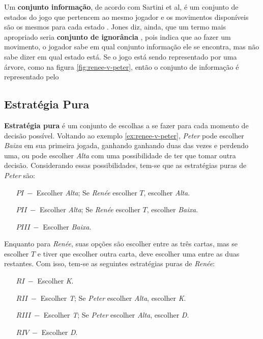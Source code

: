 Um \textbf{conjunto informação}, de acordo com Sartini et al, é um conjunto de estados do jogo que pertencem ao mesmo jogador e os movimentos disponíveis são os mesmos para cada estado \cite{sartini_IIbienaldasbm}. Jones diz, ainda, que um termo mais apropriado seria \textbf{conjunto de ignorância} \cite{jones_1980}, pois indica que ao fazer um movimento, o jogador sabe em qual conjunto informação ele se encontra, mas não sabe dizer em qual estado está. Se o jogo está sendo representado por uma árvore, como na figura \ref{fig:renee-v-peter}, então o conjunto de informação é representado pelo

\subsection{Estratégia Pura}
\label{subsec:estrategia-pura}

\textbf{Estratégia pura} é um conjunto de escolhas a se fazer para cada momento de decisão possível. Voltando ao exemplo \ref{ex:renee-v-peter}, \emph{Peter} pode escolher \emph{Baixa} em sua primeira jogada, ganhando ganhando duas das vezes e perdendo uma, ou pode escolher \emph{Alta} com uma possibilidade de ter que tomar outra decisão. Considerando essas possibilidades, tem-se que as estratégias puras de \emph{Peter} são:

\begin{enumerate}
	\tightlist
	\item[$ PI\ -$] Escolher \emph{Alta}; Se \emph{Renée} escolher $T$, escolher \emph{Alta}.
	\item[$ PII\ -$] Escolher \emph{Alta}; Se \emph{Renée} escolher $T$, escolher \emph{Baixa}.
	\item[$ PIII\ -$] Escolher \emph{Baixa}.
\end{enumerate}

Enquanto para \emph{Renée}, suas opções são escolher entre as três cartas, mas se escolher $T$ e tiver que escolher outra carta, deve escolher uma entre as duas restantes. Com isso, tem-se as seguintes estratégias puras de \emph{Renée}:

\begin{enumerate}
	\tightlist
	\item[$ RI\ -$] Escolher \emph{K}.
	\item[$ RII\ -$] Escolher \emph{T}; Se \emph{Peter} escolher \emph{Alta}, escolher \emph{K}.
	\item[$ RIII\ -$] Escolher \emph{T}; Se \emph{Peter} escolher \emph{Alta}, escolher \emph{D}.
	\item[$ RIV\ -$] Escolher \emph{D}.
\end{enumerate}

